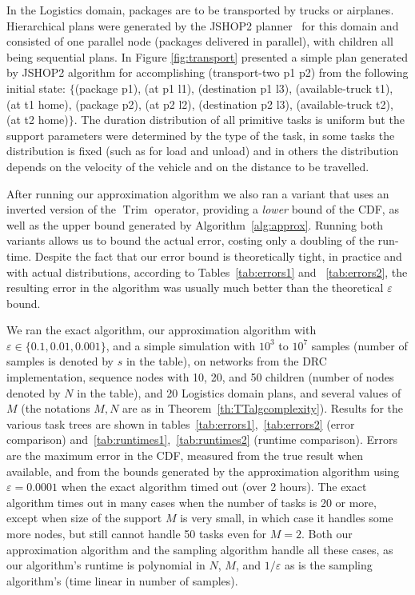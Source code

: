 \documentclass{article}
\DeclareMathOperator{\Trim}{Trim}
\begin{document}
In the Logistics domain, packages are to be transported by trucks or airplanes.
Hierarchical plans were generated by the JSHOP2 planner~\cite{nau2003shop2} for this domain and consisted of one parallel node (packages delivered in parallel),
with children all being sequential plans. In Figure {\ref{fig:transport}} presented a simple plan generated by JSHOP2 algorithm for accomplishing (transport-two p1 p2) from the following initial state: $\{$(package p1), (at p1 l1), (destination p1 l3), (available-truck t1), (at t1 home),
(package p2), (at p2 l2), (destination p2 l3), (available-truck t2), (at t2 home)$\}$.
The duration distribution of all primitive tasks is uniform but the support parameters were determined by the type of the task, 
in some tasks the distribution is fixed (such as for load and unload) and in others the distribution depends on the velocity of the vehicle
and on the distance to be travelled.

After running our approximation algorithm we also ran a variant
that uses an inverted version of the $\Trim$ operator, providing a {\em lower} bound of the CDF, as well as the upper bound
generated by Algorithm~\ref{alg:approx}. Running both variants allows us to bound the actual error, costing
only a doubling of the run-time. Despite the fact that our error bound is theoretically tight, in practice
and with actual distributions, according to Tables~\ref{tab:errors1} and ~\ref{tab:errors2}, the resulting error
in the algorithm was usually much better than the theoretical $\varepsilon$ bound.


We ran the exact algorithm, our approximation algorithm with $\varepsilon \in \{ 0.1, 0.01, 0.001\}$, and a simple simulation with 
$10^3$ to $10^7$ samples (number of samples is denoted by $s$ in the table), on networks from the DRC
implementation, sequence nodes with 10, 20, and 50 children (number of nodes denoted by $N$ in the table), and 20 Logistics domain plans, and
several values of $M$ (the notations $M, N$ are as in Theorem~\ref{th:TTalgcomplexity}). 
Results for the various task trees are shown in tables~\ref{tab:errors1},~\ref{tab:errors2} (error comparison) and~\ref{tab:runtimes1},~\ref{tab:runtimes2} (runtime comparison).
Errors are the maximum error in the CDF, measured from the true result when available, and from the bounds generated by the approximation algorithm using $\varepsilon = 0.0001$
when the exact algorithm timed out (over 2 hours). 
The exact algorithm times out in many cases when the number of tasks is 20 or more, except when size of the support $M$ is very small, in which case it handles some more nodes, but still cannot handle 
50 tasks even for $M=2$.
Both our approximation algorithm and the sampling algorithm handle all these cases, as our algorithm's runtime is polynomial in $N$, $M$, and ${1}/{\varepsilon}$
as is the sampling algorithm's (time linear in number of samples). 
\end{document}

